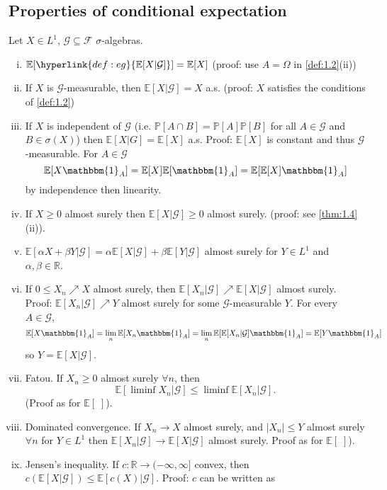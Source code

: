 \documentclass{article}
\newcommand{\F}{\mathcal{F}}
\newcommand{\G}{\mathcal{G}}
\newcommand{\1}[1]{\mathbbm{1}_{#1}}
\newcommand{\Prob}{\mathbb{P}}
\newcommand{\E}{\mathbb{E}}
\begin{document}
\subsection{Properties of conditional expectation}
Let $X \in L^1$, $\G \subseteq \F$ $\sigma$-algebras.
\begin{enumerate}[(i)]
  \item $\E[\hyperlink{def:eg}{\E[X | \G]}] = \E[X]$ (proof: use $A = \Omega$ in \cref{def:1.2}(ii))
  \item If $X$ is $\G$-measurable, then $\E[X | \G] = X$ a.s. (proof: $X$ satisfies the conditions of \cref*{def:1.2})
  \item If $X$ is \hypertarget{def:indep}{independent} of $\G$ (i.e. $\Prob[A \cap B] = \Prob[A] \Prob[B]$ for all $A \in \G$ and $B \in \sigma(X)$) then $\E[X | G] = \E[X]$ a.s.
    Proof: $\E[X]$ is constant and thus $\G$-measurable. For $A \in \G$
    \begin{equation*}
      \E[X \1A] = \E[X] \E[\1A] = \E[\E[X] \1A]
    \end{equation*}
    by independence then linearity.
  \item If $X \geq 0$ almost surely then $\E[X|\G] \geq 0$ almost surely.
    (proof: see \cref{thm:1.4}(ii)).
  \item $\E[\alpha X + \beta Y | \G] = \alpha \E[X | \G] + \beta \E[Y | \G]$ almost surely for $Y \in L^1$ and $\alpha,\beta \in \mathbb{R}$.
  \item If $0 \leq X_n \nearrow X$ almost surely, then $\E[X_n | \G] \nearrow \E[X | \G]$ almost surely.
    Proof: $\E[X_n | \G] \nearrow Y$ almost surely for some $\G$-measurable $Y$. For every $A \in \G$,
    \begin{equation*}
      \E[X \1A] = \lim_n \E[X_n \1A] = \lim_n \E[\E[X_n | \G] \1A] = \E[Y \1A]
    \end{equation*}
    so $Y = \E[X | \G]$.
  \item Fatou. If $X_n \geq 0$ almost surely $\forall n$, then
    \begin{equation*}
      \E[\liminf X_n | \G] \leq \liminf \E[X_n | \G].
    \end{equation*}
    (Proof as for $\E[\;]$).
  \item Dominated convergence. If $X_n \to X$ almost surely, and $|X_n| \leq Y$ almost surely $\forall n$ for $Y \in L^1$ then $\E[X_n | \G] \to \E[X | \G]$ almost surely. Proof as for $\E[\;]$).
  \item Jensen's inequality. If $c: \mathbb{R} \to (-\infty, \infty]$ convex, then $c(\E[X | \G]) \leq \E[c(X) | \G]$. Proof: $c$ can be written as

\end{enumerate}
\end{document}
